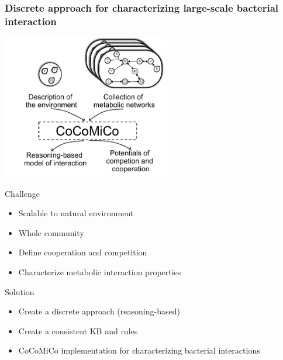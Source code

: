 \documentclass[8pt,usenames,dvipsnames]{beamer}
\begin{document}
\begin{frame}
\frametitle{Discrete approach for characterizing large-scale bacterial interaction}
\centering
\includegraphics[width=0.55\textwidth]{figures/concept.pdf}

\begin{minipage}{0.5\textwidth}
\vspace{-0.3cm}
\begin{block}{Challenge}
\begin{itemize}
\item Scalable to natural environment 
\item Whole community
\item Define cooperation and competition
\item Characterize metabolic interaction properties 
\end{itemize}
\end{block}
\end{minipage}%
\hspace{0.2cm}
\hfill
\begin{minipage}{0.45\textwidth}
\vspace{-0.3cm}
\begin{alertblock}{Solution}
\begin{itemize}
\item Create a discrete approach (reasoning-based)
\item Create a consistent KB and rules
\item CoCoMiCo implementation for characterizing bacterial interactions
\end{itemize}
\end{alertblock}
\end{minipage}

\end{frame}
\end{document}
